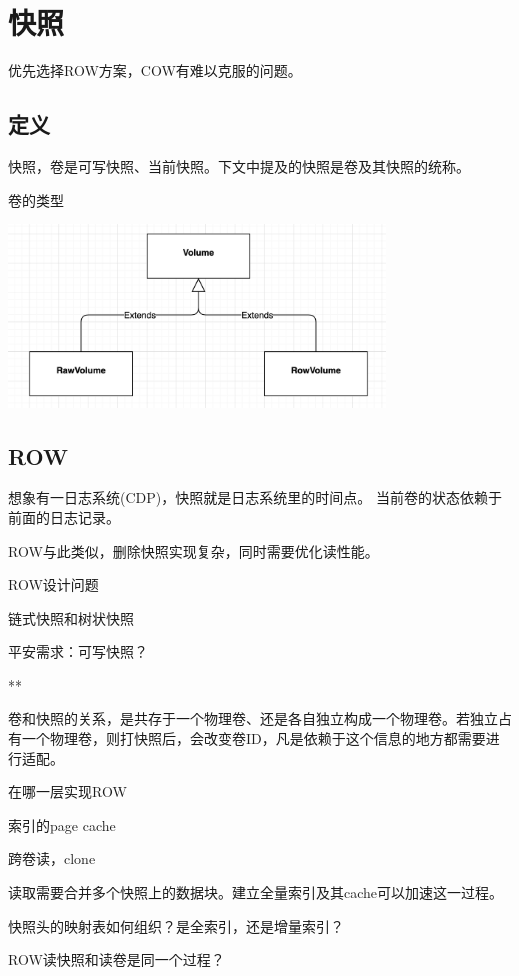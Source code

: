 \chapter{快照}

优先选择ROW方案，COW有难以克服的问题。

\section{定义}

快照，卷是可写快照、当前快照。下文中提及的快照是卷及其快照的统称。

卷的类型
\begin{center}
\includegraphics[width=10cm]{../imgs/volume-type.png}
\end{center}

\section{ROW}

想象有一日志系统(CDP)，快照就是日志系统里的时间点。
当前卷的状态依赖于前面的日志记录。

ROW与此类似，删除快照实现复杂，同时需要优化读性能。

ROW设计问题
\begin{enumbox}
\item 链式快照和树状快照
\item 平安需求：可写快照？
\item ***
\item 卷和快照的关系，是共存于一个物理卷、还是各自独立构成一个物理卷。若独立占有一个物理卷，则打快照后，会改变卷ID，凡是依赖于这个信息的地方都需要进行适配。
\item 在哪一层实现ROW
\item 索引的page cache
\item 跨卷读，clone
\item 读取需要合并多个快照上的数据块。建立全量索引及其cache可以加速这一过程。
\item 快照头的映射表如何组织？是全索引，还是增量索引？
\item ROW读快照和读卷是同一个过程？
\end{enumbox}

